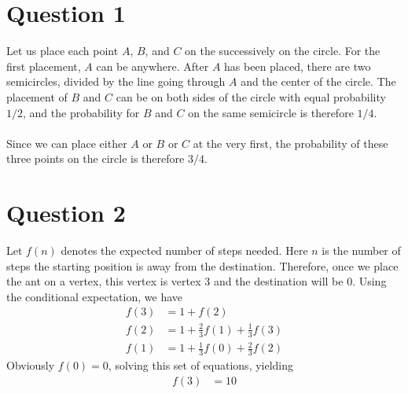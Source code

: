 \documentclass[12pt]{article}
\begin{document}
\section*{Question 1}
\begin{solution}
Let us place each point $A$, $B$, and $C$ on the  successively on the circle. For the first placement, $A$ can be anywhere. After $A$ has been placed, there are two semicircles, divided by the line going through $A$ and the center of the circle. The placement of $B$ and $C$ can be on both sides of the circle with equal probability $1/2$, and the probability for $B$ and $C$ on the same semicircle is therefore $1/4$. \\
\\
Since we can place either $A$ or $B$ or $C$ at the very first, the probability of these three points on the circle is therefore $3/4$.
\end{solution}


\section*{Question 2}
\begin{solution}
Let $f(n)$ denotes the expected number of steps needed. Here $n$ is the number of steps the starting position is away from the destination. Therefore, once we place the ant on a vertex, this vertex is vertex 3 and the destination will be 0. Using the conditional expectation, we have
\begin{align}
f(3) &= 1 + f(2)\\
f(2) &= 1+\frac{2}{3}f(1)+\frac{1}{3}f(3)\\
f(1) &= 1+\frac{1}{3}f(0)+\frac{2}{3}f(2)
\end{align}
Obviously $f(0)=0$, solving this set of equations, yielding 
\begin{align}
f(3) &= 10
\end{align}
\end{solution}
\end{document}
